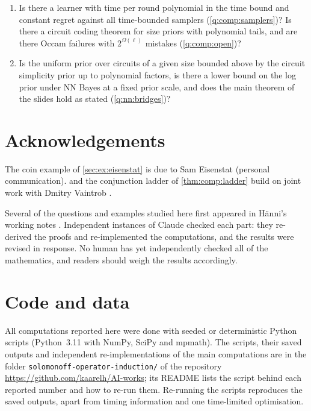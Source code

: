 \begin{enumerate}[leftmargin=*,label=(\arabic*)]
\item Is there a learner with time per round polynomial in the time bound and constant regret against all time-bounded samplers (\cref{q:comp:samplers})? Is there a circuit coding theorem for size priors with polynomial tails, and are there Occam failures with $2^{\Omega(\ell)}$ mistakes (\cref{q:comp:open})?
\item Is the uniform prior over circuits of a given size bounded above by the circuit simplicity prior up to polynomial factors, is there a lower bound on the log prior under NN Bayes at a fixed prior scale, and does the main theorem of the slides hold as stated (\cref{q:nn:bridges})?
\end{enumerate}

\section*{Acknowledgements}
The coin example of \cref{sec:ex:eisenstat} is due to Sam Eisenstat (personal communication).  and the conjunction ladder of \cref{thm:comp:ladder} build on joint work with Dmitry Vaintrob \citep{vaintrobhanni2026nnbayes}.

Several of the questions and examples studied here first appeared in H\"anni's working notes \citep{hanni2026notes}. Independent instances of Claude checked each part: they re-derived the proofs and re-implemented the computations, and the results were revised in response. No human has yet independently checked all of the mathematics, and readers should weigh the results accordingly.

\section*{Code and data}
All computations reported here were done with seeded or deterministic Python scripts (Python~3.11 with NumPy, SciPy and mpmath). The scripts, their saved outputs and independent re-implementations of the main computations are in the folder \texttt{solomonoff-operator-induction/} of the repository \url{https://github.com/kaarelh/AI-works}; its README lists the script behind each reported number and how to re-run them. Re-running the scripts reproduces the saved outputs, apart from timing information and one time-limited optimisation.
